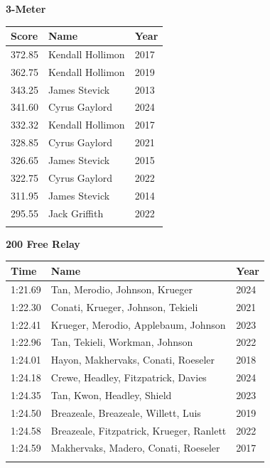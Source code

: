 \hfill
\begin{minipage}[t]{0.48\textwidth}
\centering
\textbf{\textcolor{teamprimary}{3-Meter}}\par
\vspace{0.5em}
\centering
\small
\renewcommand{\arraystretch}{1.0}
\setlength{\tabcolsep}{4pt}
\begin{tabular}{@{}p{1.8cm}p{3.0cm}p{1.0cm}@{}}
\toprule
\textbf{Score} & \textbf{Name} & \textbf{Year} \\
\midrule
372.85 & Kendall Hollimon & 2017 \\
362.75 & Kendall Hollimon & 2019 \\
343.25 & James Stevick & 2013 \\
341.60 & Cyrus Gaylord & 2024 \\
332.32 & Kendall Hollimon & 2017 \\
328.85 & Cyrus Gaylord & 2021 \\
326.65 & James Stevick & 2015 \\
322.75 & Cyrus Gaylord & 2022 \\
311.95 & James Stevick & 2014 \\
295.55 & Jack Griffith & 2022 \\
\bottomrule
\vspace{0.5em}
\end{tabular}
\end{minipage}
\clearpage
\vspace{1.2em}
\noindent\begin{minipage}[t]{0.98\textwidth}
\centering
\textbf{\textcolor{teamprimary}{200 Free Relay}}\par
\vspace{0.5em}
\centering
\small
\renewcommand{\arraystretch}{1.0}
\setlength{\tabcolsep}{4pt}
\begin{tabular}{@{}p{4.5cm}p{8.5cm}p{2.5cm}@{}}
\toprule
\textbf{Time} & \textbf{Name} & \textbf{Year} \\
\midrule
1:21.69 & Tan, Merodio, Johnson, Krueger & 2024 \\
1:22.30 & Conati, Krueger, Johnson, Tekieli & 2021 \\
1:22.41 & Krueger, Merodio, Applebaum, Johnson & 2023 \\
1:22.96 & Tan, Tekieli, Workman, Johnson & 2022 \\
1:24.01 & Hayon, Makhervaks, Conati, Roeseler & 2018 \\
1:24.18 & Crewe, Headley, Fitzpatrick, Davies & 2024 \\
1:24.35 & Tan, Kwon, Headley, Shield & 2023 \\
1:24.50 & Breazeale, Breazeale, Willett, Luis & 2019 \\
1:24.58 & Breazeale, Fitzpatrick, Krueger, Ranlett & 2022 \\
1:24.59 & Makhervaks, Madero, Conati, Roeseler & 2017 \\
\bottomrule
\vspace{0.5em}
\end{tabular}
\end{minipage}
